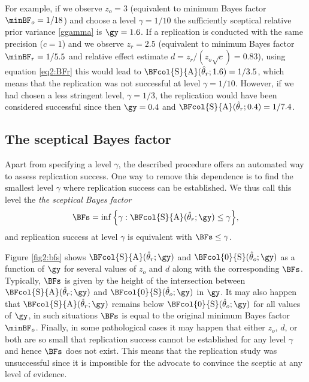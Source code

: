 For example, if we observe $z_o = 3$ (equivalent to minimum Bayes factor
$\minBF_{o} = 1/18$) and choose a level $\gamma = 1/10$
the sufficiently sceptical relative prior variance \eqref{ggamma} is
$\gy = 1.6$. If a replication is conducted with the
same precision ($c = 1$) and we observe $z_r = 2.5$ (equivalent to
minimum Bayes factor $\minBF_{r} = 1/5.5$ and relative effect
estimate $d = z_{r}/(z_{o}\sqrt{c}) = 0.83$), using equation
\eqref{eq2:BFr} this would lead to $\BFcol{\mathrm{S}}{\mathrm{A}}(\hat{\theta}_r;
1.6) = 1/3.5$, which means
that the replication was not successful at level $\gamma = 1/10$.
However, if we had chosen a less stringent level, \eg{}$\gamma =
1/3$, the replication would have been considered successful
since then $\gy = 0.4$ and
$\BFcol{\mathrm{S}}{\mathrm{A}}(\hat{\theta}_r; 0.4)
= 1/7.4$.

\subsection{The sceptical Bayes factor}
Apart from specifying a level $\gamma$, the described procedure offers an
automated way to assess replication success. One way to remove this dependence
is to find the smallest level $\gamma$ where replication success can be
established. We thus call this level the \emph{the sceptical Bayes factor}
\begin{align}
  \label{eq2:bfs}
  \BFs
  =
  \inf
  \Big\{\gamma :
  \BFcol{\mathrm{S}}{\mathrm{A}}(\hat{\theta}_r; \gy)
  \leq \gamma\Big\},
\end{align}
and replication success at level $\gamma$ is equivalent with $\BFs \leq \gamma$.

Figure \ref{fig2:bfs} shows $\BFcol{\mathrm{S}}{\mathrm{A}}(\hat{\theta}_r; \gy)$ and
$\BFcol{0}{\mathrm{S}}(\hat{\theta}_o; \gy)$ as a function of $\gy$ for several
values of $z_o$ and $d$ along with the corresponding $\BFs$. Typically, $\BFs$
is given by the height of the intersection between
$\BFcol{\mathrm{S}}{\mathrm{A}}(\hat{\theta}_r; \gy)$ and
$\BFcol{0}{\mathrm{S}}(\hat{\theta}_o; \gy)$ in $\gy$. It may also happen that
$\BFcol{\mathrm{S}}{\mathrm{A}}(\hat{\theta}_r; \gy)$ remains below
$\BFcol{0}{\mathrm{S}}(\hat{\theta}_o; \gy)$ for all values of $\gy$, in such
situations $\BFs$ is equal to the original minimum Bayes factor $\minBF_o$.
Finally, in some pathological cases it may happen that either $z_o$, $d$, or
both are so small that replication success cannot be established for any level
$\gamma$ and hence $\BFs$ does not exist. This means that the replication study
was unsuccessful since it is impossible for the advocate to convince the sceptic
at any level of evidence.


